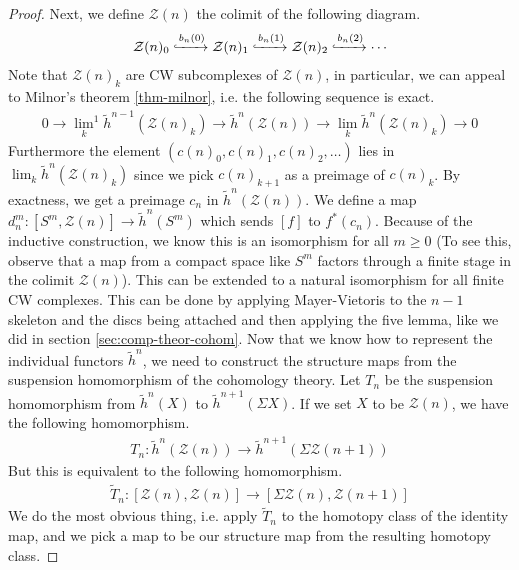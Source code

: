 \documentclass[12pt, notitlepage]{article}
\theoremstyle{definition}
\newcommand{\calz}{\mathcal{Z}}
\newcommand{\redco}{\widetilde{h}}
\begin{document}
\begin{proof}
  Next, we define $\calz(n)$ the colimit of the following diagram.
  \begin{align*}
    \calz(n)_0 \xhookrightarrow{b_n(0)} \calz(n)_1 \xhookrightarrow{b_n(1)} \calz(n)_2 \xhookrightarrow{b_n(2)} \cdots
  \end{align*}
  Note that $\calz(n)_k$ are CW subcomplexes of $\calz(n)$, in particular, we can appeal to Milnor's
  theorem \ref{thm-milnor}, i.e. the following sequence is exact.
  \begin{align*}
    0 \rightarrow {\lim_{k}}^1 \redco^{n-1} (\calz(n)_k) \rightarrow \redco^{n} (\calz(n)) \rightarrow \lim_{k} \redco^{n} (\calz(n)_k) \rightarrow 0
  \end{align*}
  Furthermore the element $(c(n)_0, c(n)_1, c(n)_2, \ldots)$ lies in
  $\lim_{k} \redco^{n} (\calz(n)_k)$ since we pick $c(n)_{k+1}$ as a preimage of $c(n)_k$. By
  exactness, we get a preimage $c_n$ in $\redco^{n} (\calz(n))$. We define a map
  $d_n^m: [S^m, \calz(n)] \to \redco^{n}(S^m)$ which sends $[f]$ to $f^{\ast}(c_n)$. Because of the
  inductive construction, we know this is an isomorphism for all $m \geq 0$ (To see this, observe
  that a map from a compact space like $S^m$ factors through a finite stage in the colimit
  $\calz(n)$). This can be extended to a natural isomorphism for all finite CW complexes.  This can
  be done by applying Mayer-Vietoris to the $n-1$ skeleton and the discs being attached and then
  applying the five lemma, like we did in section \ref{sec:comp-theor-cohom}.  Now that we know how
  to represent the individual functors $\redco^{n}$, we need to construct the structure maps from
  the suspension homomorphism of the cohomology theory. Let $T_n$ be the suspension homomorphism
  from $\redco^n(X)$ to $\redco^{n+1}(\Sigma X)$. If we set $X$ to be $\calz(n)$, we have the
  following homomorphism.
  \begin{align*}
    T_n: \redco^n(\calz(n)) \to \redco^{n+1}(\Sigma \calz(n+1))
  \end{align*}
  But this is equivalent to the following homomorphism.
  \begin{align*}
    \widetilde{T}_n: [\calz(n), \calz(n)] \to [\Sigma \calz(n), \calz(n+1)]
  \end{align*}
  We do the most obvious thing, i.e. apply $\widetilde{T}_n$ to the homotopy class of the identity
  map, and we pick a map to be our structure map from the resulting homotopy class.

\end{proof}
\end{document}
